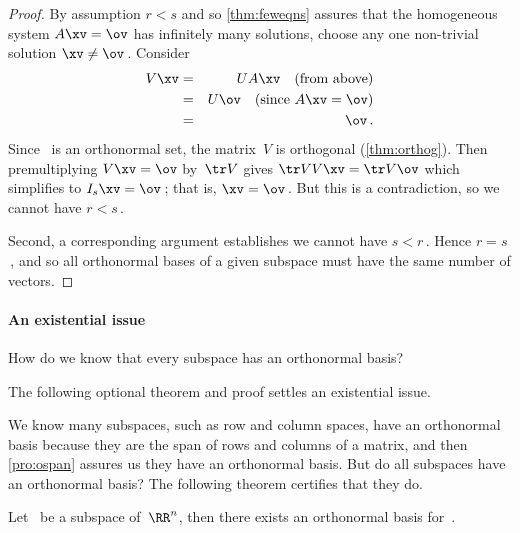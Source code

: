 \begin{proof}
By assumption \(r<s\) and so \autoref{thm:feweqns} assures that the homogeneous system \(A\xv=\ov\) has infinitely many solutions, choose any one non-trivial solution \(\xv\neq\ov\)\,.
Consider 
\begin{eqnarray*}
V\xv&=& UA\xv\quad(\text{from above})
\\&=&U\ov\quad(\text{since }A\xv=\ov)
\\&=&\ov\,.
\end{eqnarray*}
Since \cV\ is an orthonormal set, the matrix~\(V\) is orthogonal (\autoref{thm:orthog}).  
Then premultiplying \(V\xv=\ov\) by~\(\tr V\) gives \(\tr VV\xv=\tr V\ov\) which simplifies to \(I_s\xv=\ov\)\,; that is, \(\xv=\ov\)\,.  
But this is a contradiction, so we cannot have \(r<s\)\,.

Second, a corresponding argument establishes we cannot have \(s<r\)\,.
Hence \(r=s\)\,, and so all orthonormal bases of a given subspace must have the same number of vectors.
\end{proof}







\begin{comment}
Some books do not appear to establish that every subspace is a span of something.  The following argument is similar to Gramm--Schmidt, but not identical.  
\end{comment}

\paragraph{An existential issue} 
How do we know that every subspace has an orthonormal basis? 
\begin{aside}
The following optional theorem and proof settles an existential issue.
\end{aside}%
We know many subspaces, such as row and column spaces, have an orthonormal basis because they are the span of rows and columns of a matrix, and then \autoref{pro:ospan} assures us they have an orthonormal basis.
But do all subspaces have an orthonormal basis?  
The following theorem certifies that they do.



\begin{theorem} \label{thm:obaseexists}
Let \WW\ be a subspace of~\(\RR^n\), then there exists an orthonormal basis for~\WW.
\end{theorem}


